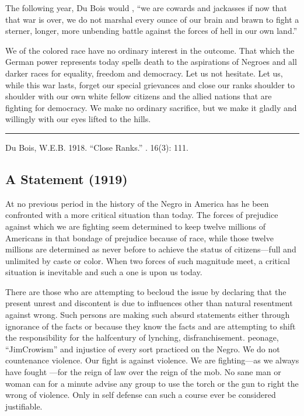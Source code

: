 \documentclass[letterpaper,10pt,english]{jupyterBook}
\begin{document}
\begin{sphinxShadowBox}
\sphinxstylesidebartitle{}

\sphinxAtStartPar
The following year, Du Bois would , “we are cowards and jackasses if now that that war is over, we do not marshal every ounce of our brain and brawn to fight a sterner, longer, more unbending battle against the forces of hell in our own land.”
\end{sphinxShadowBox}

\sphinxAtStartPar
We of the colored race have no ordinary interest in the outcome. That which the German power represents today spells death to the aspirations of Negroes and all darker races for equality, freedom and democracy. Let us not hesitate. Let us, while this war lasts, forget our special grievances and close our ranks shoulder to shoulder with our own white fellow citizens and the allied nations that are fighting for democracy. We make no ordinary sacrifice, but we make it gladly and willingly with our eyes lifted to the hills.


\bigskip\hrule\bigskip


\sphinxAtStartPar
{} Du Bois, W.E.B. 1918. “Close Ranks.” . 16(3): 111.


\subsection{A Statement (1919)}
\label{\detokenize{Volumes/19/01/statement:a-statement-1919}}\label{\detokenize{Volumes/19/01/statement::doc}}
\sphinxAtStartPar
At no previous period in the history of the Negro in America has he been confronted with a more critical situation than today. The forces of prejudice against which we are fighting seem determined to keep twelve millions of Americans in that bondage of prejudice because of race, while those twelve millions are determined as never before to achieve the status of citizens—full and unlimited by caste or color. When two forces of such magnitude meet, a critical situation is inevitable and such a one is upon us today.

\sphinxAtStartPar
There are those who are attempting to becloud the issue by declaring that the present unrest and discontent is due to influences other than natural resentment against wrong. Such persons are making such absurd statements either through ignorance of the facts or because they know the facts and are attempting to shift the responsibility for the half\sphinxhyphen{}century of lynching, disfranchisement. peonage, “Jim\sphinxhyphen{}Crowism” and injustice of every sort practiced on the Negro. We do not countenance violence. Our fight is against violence. We are fighting—as we always have fought —for the reign of law over the reign of the mob. No sane man or woman
can for a minute advise any group to use the torch or the gun to right the wrong of violence. Only in self defense can such a course ever be considered justifiable.
\end{document}
